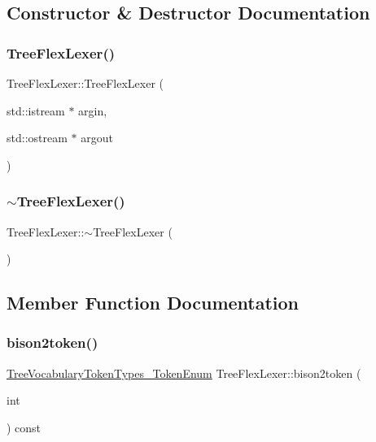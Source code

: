 \subsection{Constructor \& Destructor Documentation}
\mbox{\label{structTreeFlexLexer_ac0c0f62e3a211da011dfdaeaf901a433}} 
\subsubsection{\texorpdfstring{Tree\+Flex\+Lexer()}{TreeFlexLexer()}}
{\footnotesize\ttfamily Tree\+Flex\+Lexer\+::\+Tree\+Flex\+Lexer (\begin{DoxyParamCaption}\item[{std\+::istream $\ast$}]{argin,  }\item[{std\+::ostream $\ast$}]{argout }\end{DoxyParamCaption})}

\mbox{\label{structTreeFlexLexer_a2d37f5ef0de96df208789f90fc42be91}} 
\subsubsection{\texorpdfstring{$\sim$\+Tree\+Flex\+Lexer()}{~TreeFlexLexer()}}
{\footnotesize\ttfamily Tree\+Flex\+Lexer\+::$\sim$\+Tree\+Flex\+Lexer (\begin{DoxyParamCaption}{ }\end{DoxyParamCaption})\hspace{0.3cm}{\ttfamily [override]}}



\subsection{Member Function Documentation}
\mbox{\label{structTreeFlexLexer_a95439c970bf3893bd8819eef2721aae9}} 
\subsubsection{\texorpdfstring{bison2token()}{bison2token()}}
{\footnotesize\ttfamily \hyperlink{token__interface_8hpp_a14502d0757789149f644966ca931b126}{Tree\+Vocabulary\+Token\+Types\+\_\+\+Token\+Enum} Tree\+Flex\+Lexer\+::bison2token (\begin{DoxyParamCaption}\item[{int}]{ }\end{DoxyParamCaption}) const}

